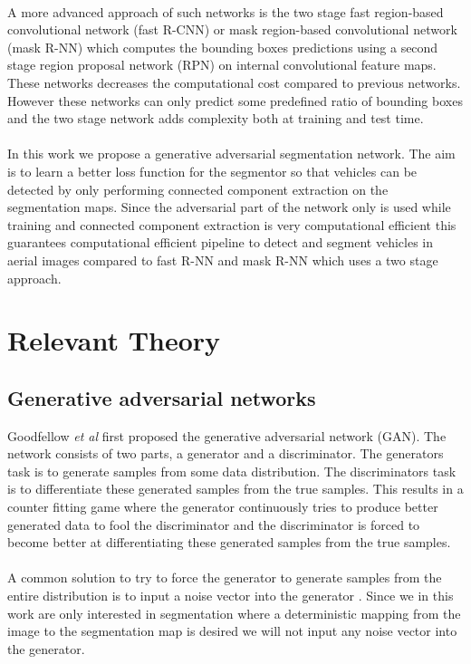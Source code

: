 \documentclass[a4paper,11pt]{article}
\begin{document}
\\
A more advanced approach of such networks is the two stage fast region-based convolutional network (fast R-CNN) \cite{ren_faster_2015, girshick_fast_2015} or mask region-based convolutional network (mask R-NN) \cite{he_mask_2017} which computes the bounding boxes predictions using a second stage region proposal network (RPN) on internal convolutional feature maps. These networks decreases the computational cost compared to previous networks.  However these networks can only predict some predefined ratio of bounding boxes and the two stage network adds complexity both at training and test time.\\
\\
In this work we propose a generative adversarial segmentation network. The aim is to learn a better loss function for the segmentor so that vehicles can be detected by only performing connected component extraction on the segmentation maps. Since the adversarial part of the network only is used while training and connected component extraction is very computational efficient this guarantees computational efficient pipeline to detect and segment vehicles in aerial images compared to fast R-NN and mask R-NN which uses a two stage approach.
\section{Relevant Theory}
\subsection{Generative adversarial networks}
Goodfellow \textit{et al} \cite{goodfellow_nips_2016} first proposed the generative adversarial network (GAN). The network consists of two parts, a generator and a discriminator. The generators task is to generate samples from some data distribution. The discriminators task is to differentiate these generated samples from the true samples. This results in a counter fitting game where the generator continuously tries to produce better generated data to fool the discriminator and the discriminator is forced to become better at differentiating these generated samples from the true samples.\\
\\
A common solution to try to force the generator to generate samples from the entire distribution is to input a noise vector into the generator \cite{reed_generative_2016}. Since we in this work are only interested in segmentation where a deterministic mapping from the image to the segmentation map is desired we will not input any  noise vector into the generator.
\end{document}
